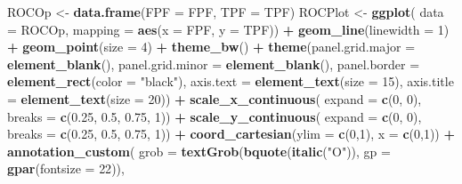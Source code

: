 \documentclass[
]{book}
\newenvironment{Shaded}{\begin{snugshade}}{\end{snugshade}}
\newcommand{\DataTypeTok}[1]{\textcolor[rgb]{0.13,0.29,0.53}{#1}}
\newcommand{\DecValTok}[1]{\textcolor[rgb]{0.00,0.00,0.81}{#1}}
\newcommand{\FloatTok}[1]{\textcolor[rgb]{0.00,0.00,0.81}{#1}}
\newcommand{\KeywordTok}[1]{\textcolor[rgb]{0.13,0.29,0.53}{\textbf{#1}}}
\newcommand{\NormalTok}[1]{#1}
\newcommand{\OperatorTok}[1]{\textcolor[rgb]{0.81,0.36,0.00}{\textbf{#1}}}
\newcommand{\StringTok}[1]{\textcolor[rgb]{0.31,0.60,0.02}{#1}}
\begin{document}
\begin{Shaded}
\begin{Highlighting}[]
\NormalTok{ROCOp <-}\StringTok{ }\KeywordTok{data.frame}\NormalTok{(}\DataTypeTok{FPF =}\NormalTok{ FPF, }\DataTypeTok{TPF =}\NormalTok{ TPF)}
\NormalTok{ROCPlot <-}\StringTok{ }\KeywordTok{ggplot}\NormalTok{(}
  \DataTypeTok{data =}\NormalTok{ ROCOp, }
  \DataTypeTok{mapping =} \KeywordTok{aes}\NormalTok{(}\DataTypeTok{x =}\NormalTok{ FPF, }\DataTypeTok{y =}\NormalTok{ TPF)) }\OperatorTok{+}\StringTok{ }
\StringTok{  }\KeywordTok{geom_line}\NormalTok{(}\DataTypeTok{linewidth =} \DecValTok{1}\NormalTok{) }\OperatorTok{+}\StringTok{ }
\StringTok{  }\KeywordTok{geom_point}\NormalTok{(}\DataTypeTok{size =} \DecValTok{4}\NormalTok{) }\OperatorTok{+}\StringTok{ }
\StringTok{  }\KeywordTok{theme_bw}\NormalTok{() }\OperatorTok{+}\StringTok{ }
\StringTok{  }\KeywordTok{theme}\NormalTok{(}\DataTypeTok{panel.grid.major =} \KeywordTok{element_blank}\NormalTok{(), }
        \DataTypeTok{panel.grid.minor =} \KeywordTok{element_blank}\NormalTok{(), }
        \DataTypeTok{panel.border =} \KeywordTok{element_rect}\NormalTok{(}\DataTypeTok{color =} \StringTok{"black"}\NormalTok{), }
        \DataTypeTok{axis.text =} \KeywordTok{element_text}\NormalTok{(}\DataTypeTok{size =} \DecValTok{15}\NormalTok{), }
        \DataTypeTok{axis.title =} \KeywordTok{element_text}\NormalTok{(}\DataTypeTok{size =} \DecValTok{20}\NormalTok{)) }\OperatorTok{+}
\StringTok{  }\KeywordTok{scale_x_continuous}\NormalTok{(}
    \DataTypeTok{expand =} \KeywordTok{c}\NormalTok{(}\DecValTok{0}\NormalTok{, }\DecValTok{0}\NormalTok{), }
    \DataTypeTok{breaks =} \KeywordTok{c}\NormalTok{(}\FloatTok{0.25}\NormalTok{, }\FloatTok{0.5}\NormalTok{, }\FloatTok{0.75}\NormalTok{, }\DecValTok{1}\NormalTok{)) }\OperatorTok{+}\StringTok{ }
\StringTok{  }\KeywordTok{scale_y_continuous}\NormalTok{(}
    \DataTypeTok{expand =} \KeywordTok{c}\NormalTok{(}\DecValTok{0}\NormalTok{, }\DecValTok{0}\NormalTok{), }\DataTypeTok{breaks =} \KeywordTok{c}\NormalTok{(}\FloatTok{0.25}\NormalTok{, }\FloatTok{0.5}\NormalTok{, }\FloatTok{0.75}\NormalTok{, }\DecValTok{1}\NormalTok{)) }\OperatorTok{+}
\StringTok{  }\KeywordTok{coord_cartesian}\NormalTok{(}\DataTypeTok{ylim =} \KeywordTok{c}\NormalTok{(}\DecValTok{0}\NormalTok{,}\DecValTok{1}\NormalTok{), }\DataTypeTok{x =} \KeywordTok{c}\NormalTok{(}\DecValTok{0}\NormalTok{,}\DecValTok{1}\NormalTok{)) }\OperatorTok{+}\StringTok{ }
\StringTok{  }\KeywordTok{annotation_custom}\NormalTok{(}
    \DataTypeTok{grob =} \KeywordTok{textGrob}\NormalTok{(}\KeywordTok{bquote}\NormalTok{(}\KeywordTok{italic}\NormalTok{(}\StringTok{"O"}\NormalTok{)),}
                    \DataTypeTok{gp =} \KeywordTok{gpar}\NormalTok{(}\DataTypeTok{fontsize =} \DecValTok{22}\NormalTok{)), }

\end{Highlighting}
\end{Shaded}
\end{document}
